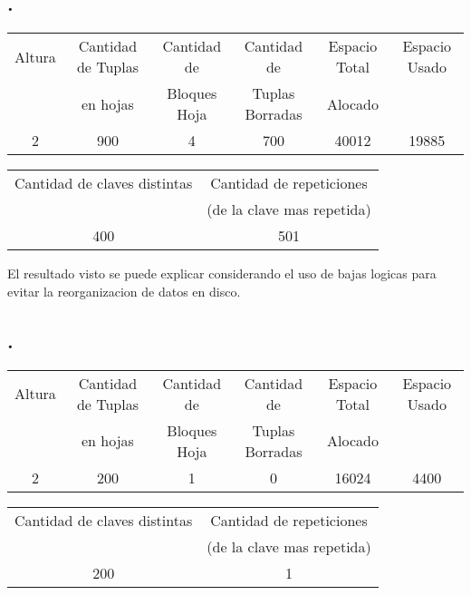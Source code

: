 \documentclass[11pt,a4paper,titlepage,leqno]{article}
\newcounter{answer}
\newcommand{\parten}[1]{
    \setcounter{answer}{#1}
    \subsection*{\arabic{answer}.}
}
\begin{document}
\parten{11}

\begin{table}[H]
    \centering
    \footnotesize
    \begin{tabular}{c|c|c|c|c|c}
        Altura & Cantidad de Tuplas & Cantidad de & Cantidad de & Espacio Total & Espacio Usado \\
        & en hojas           & Bloques Hoja                & Tuplas Borradas           & Alocado \\
        \hline
        2 & 900 & 4 & 700 & 40012 & 19885 \\
    \end{tabular}
    \label{tbl:ej2-11a}
\end{table}

\begin{table}[H]
    \centering
    \footnotesize
    \begin{tabular}{c|c}
        Cantidad de claves distintas & Cantidad de repeticiones \\
        & (de la clave mas repetida) \\
        \hline
        400 & 501

    \end{tabular}
    \label{tbl:ej2-11b}
\end{table}

El resultado visto se puede explicar considerando el uso de bajas logicas para evitar la reorganizacion de datos en disco.

\parten{13}

\begin{table}[H]
    \centering
    \footnotesize
    \begin{tabular}{c|c|c|c|c|c}
        Altura & Cantidad de Tuplas & Cantidad de & Cantidad de & Espacio Total & Espacio Usado \\
        & en hojas           & Bloques Hoja                & Tuplas Borradas           & Alocado \\
        \hline
        2 & 200 & 1 & 0 & 16024 & 4400 \\
    \end{tabular}
    \label{tbl:ej2-13a}
\end{table}

\begin{table}[H]
    \centering
    \footnotesize
    \begin{tabular}{c|c}
        Cantidad de claves distintas & Cantidad de repeticiones \\
        & (de la clave mas repetida) \\
        \hline
        200 & 1

    \end{tabular}
    \label{tbl:ej2-13b}
\end{table}
\end{document}
